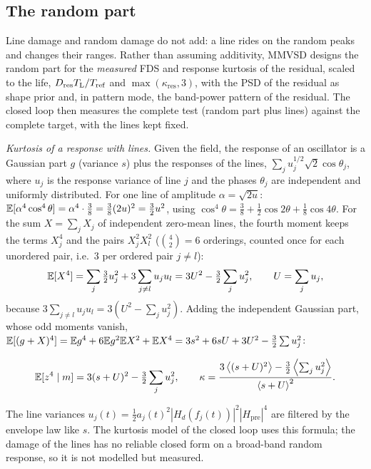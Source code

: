 \subsection{The random part}

Line damage and random damage do not add: a line rides on the random peaks and changes their ranges.
Rather than assuming additivity, MMVSD designs the random part for the \emph{measured} FDS and response
kurtosis of the residual, scaled to the life, $D_{\mathrm{res}}T_{\mathrm{L}}/T_{\mathrm{ref}}$ and
$\max(\kappa_{\mathrm{res}},3)$, with the PSD of the residual as shape prior and, in pattern mode, the
band-power pattern of the residual. The closed loop then measures the complete test (random part plus
lines) against the complete target, with the lines kept fixed.

\emph{Kurtosis of a response with lines.} Given the field, the response of an oscillator is a
Gaussian part $g$ (variance $s$) plus the responses of the lines, $\sum_j u_j^{1/2}\sqrt2\cos\theta_j$,
where $u_j$ is the response variance of line $j$ and the phases $\theta_j$ are independent and uniformly
distributed. For one line of amplitude $\alpha = \sqrt{2u}$: $\mathbb{E}[\alpha^4\cos^4\theta] =
\alpha^4\cdot\tfrac38 = \tfrac38(2u)^2 = \tfrac32u^2$, using $\cos^4\theta = \tfrac38 +
\tfrac12\cos2\theta + \tfrac18\cos4\theta$. For the sum $X = \sum_jX_j$ of independent zero-mean lines,
the fourth moment keeps the terms $X_j^4$ and the pairs $X_j^2X_l^2$ ($\binom42 = 6$ orderings,
counted once for each unordered pair, i.e.\ $3$ per ordered pair $j\neq l$):
\begin{equation}
  \mathbb{E}[X^4] = \sum_j\tfrac32u_j^2 + 3\sum_{j\ne l}u_ju_l = 3U^2 - \tfrac32\sum_ju_j^2,\qquad U = \sum_ju_j ,
\end{equation}
because $3\sum_{j\ne l}u_ju_l = 3(U^2 - \sum_ju_j^2)$. Adding the independent Gaussian part, whose odd
moments vanish, $\mathbb{E}[(g+X)^4] = \mathbb{E} g^4 + 6\mathbb{E} g^2\mathbb{E} X^2 + \mathbb{E} X^4 = 3s^2 + 6sU + 3U^2 -
\tfrac32\sum u_j^2$:
\begin{result}
\begin{equation}
  \mathbb{E}[z^4\mid m] = 3(s+U)^2 - \tfrac32\sum_ju_j^2 ,
  \qquad \kappa = \frac{3\left\langle (s+U)^2 \right\rangle - \tfrac32\left\langle \sum_ju_j^2 \right\rangle}{\left\langle s+U \right\rangle^2}.
\end{equation}
\end{result}
The line variances $u_j(t) = \tfrac12a_j(t)^2|H_d(f_j(t))|^2|H_{\mathrm{pre}}|^4$ are filtered by the
envelope law like $s$. The kurtosis model of the closed loop uses this formula; the damage of the
lines has no reliable closed form on a broad-band random response, so it is not modelled but measured.

